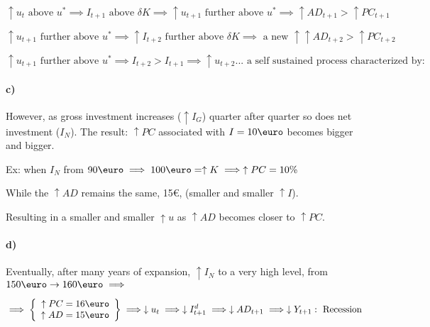 \documentclass{report}
\begin{document}
$$\uparrow u_t \text{ above } u^* \implies I_{t+1} \text{ above } \delta K \implies \uparrow u_{t+1} \text{ further above } u^* \implies \uparrow AD_{t+1} > \uparrow PC_{t+1}$$

$$\uparrow u_{t+1} \text{ further above } u^* \implies \uparrow I_{t+2} \text{ further above } \delta K \implies \text{ a new } \uparrow \uparrow AD_{t+2}>\uparrow PC_{t+2}$$

$$\uparrow u_{t+1} \text{ further above } u^* \implies I_{t+2}>I_{t+1} \implies \uparrow u_{t+2}... \text{ a self sustained process characterized by:}$$

\begin{figure}[!h]
    \centering
{}
\end{figure}

\paragraph{c)} However, as gross investment increases ($\uparrow I_G$) quarter after quarter so does net investment ($I_N$). The result: $\uparrow PC$ associated with $I=10\text{\euro}$ becomes bigger and bigger.

Ex: when $I_N$ from $90\text{\euro} \implies 100\text{\euro}=\uparrow K \implies \uparrow PC=10\%$

While the $\uparrow AD$ remains the same, 15\euro, (smaller and smaller $\uparrow I$).

Resulting in a smaller and smaller $\uparrow u$ as $\uparrow AD$ becomes closer to $\uparrow PC$. 

\paragraph{d)} Eventually, after many years of expansion, $\uparrow I_N$ to a very high level, from $150\text{\euro} \rightarrow 160 \text{\euro} \implies$


\begin{align*}
\implies \left\{ \begin{array}{r}
    \uparrow PC = 16 \text{\euro} \\ \uparrow AD = 15 \text{\euro}
\end{array} \right\} \implies \downarrow u_t \implies \downarrow I^d_{t+1} \implies \downarrow AD_{t+1} \implies \downarrow Y_{t+1}:\text{ Recession}
\end{align*}
\end{document}
